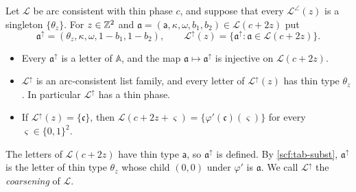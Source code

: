 \begin{lemma}[Coarsening]\label{thr:coarse}
Let $\mathcal L$ be arc consistent with thin phase $c$, and suppose that every $\mathcal L^{\angle}(z)$ is a singleton $\{\theta_z\}$. For $z\in\mathbb{Z}^2$ and $\mathfrak a=(\mathsf a,\kappa,\omega,b_1,b_2)\in\mathcal L(c+2z)$ put
\[
\mathfrak a^{\uparrow}=(\theta_z,\kappa,\omega,1-b_1,1-b_2),\qquad \mathcal L^{\uparrow}(z)=\{\mathfrak a^{\uparrow}:\mathfrak a\in\mathcal L(c+2z)\}.
\]
\begin{itemize}
\item[(a)] Every $\mathfrak a^{\uparrow}$ is a letter of $\mathbb A$, and the map $\mathfrak a\mapsto\mathfrak a^{\uparrow}$ is injective on $\mathcal L(c+2z)$.
\item[(b)] $\mathcal L^{\uparrow}$ is an arc-consistent list family, and every letter of $\mathcal L^{\uparrow}(z)$ has thin type $\theta_z$. In particular $\mathcal L^{\uparrow}$ has a thin phase.
\item[(c)] If $\mathcal L^{\uparrow}(z)=\{\mathfrak c\}$, then $\mathcal L(c+2z+\varsigma)=\{\varphi'(\mathfrak c)(\varsigma)\}$ for every $\varsigma\in\{0,1\}^2$.
\end{itemize}
\end{lemma}

The letters of $\mathcal L(c+2z)$ have thin type $\mathsf a$, so $\mathfrak a^{\uparrow}$ is defined. By \cref{scf:tab-subst}, $\mathfrak a^{\uparrow}$ is the letter of thin type $\theta_z$ whose child $(0,0)$ under $\varphi'$ is $\mathfrak a$. We call $\mathcal L^{\uparrow}$ the \emph{coarsening} of $\mathcal L$.

